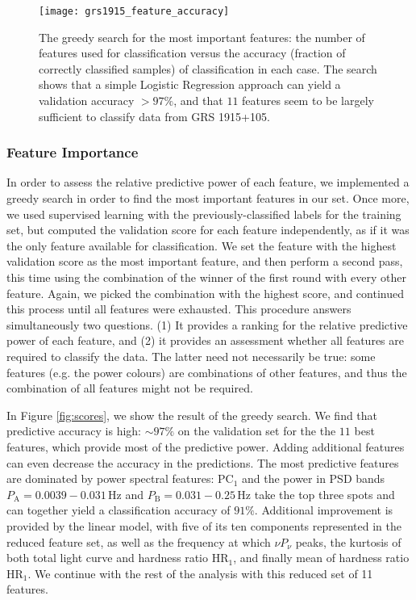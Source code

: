 \documentclass[12pt]{emulateapj}
\begin{document}
\begin{figure}[htbp]
\begin{center}
\texttt{[image: grs1915\_feature\_accuracy]}
\caption{The greedy search for the most important features: the number of features used for classification versus the accuracy (fraction of correctly classified samples) of classification in each case. The search shows that a simple Logistic Regression approach can yield a validation accuracy $>97\%$, and that $11$ features seem to be largely sufficient to classify data from GRS 1915+105.}
\label{fig:asm_total}
\end{center}
\end{figure}

\subsubsection{Feature Importance}

In order to assess the relative predictive power of each feature, we implemented a greedy search in order to find the most important features in our set. 
Once more, we used supervised learning with the previously-classified labels for the training set, but computed the validation score for each feature independently, as if it was the only feature available for classification. We set the feature with the highest validation score as the most important feature, and then perform a second pass, this time using the combination of the winner of the first round with every other feature. Again, we picked the combination with the highest score, and continued this process until all features were exhausted. This procedure answers simultaneously two questions. (1) It provides a ranking for the relative predictive power of each feature, and (2) it provides an assessment whether all features are required to classify the data. The latter need not necessarily be true: some features (e.g. the power colours) are combinations of other features, and thus the combination of all features might not be required.

In Figure \ref{fig:scores}, we show the result of the greedy search. We find that predictive accuracy is high: $\sim\!\! 97\%$ on the validation set for the the $11$ best features, which provide most of the predictive power. Adding additional features can even decrease the accuracy in the predictions. The most predictive features are dominated by power spectral features: $\mathrm{PC}_1$ and the power in PSD bands  $P_\mathrm{A} = 0.0039-0.031 \,\mathrm{Hz}$ and $P_\mathrm{B} = 0.031-0.25 \,\mathrm{Hz}$ take the top three spots and can together yield a classification accuracy of $91\%$. Additional improvement is provided by the linear model, with five of its ten components represented in the reduced feature set, as well as the frequency at which $\nu P_\nu$ peaks, the kurtosis of both total light curve and hardness ratio $\mathrm{HR}_1$, and finally mean of hardness ratio $\mathrm{HR}_1$. We continue with the rest of the analysis with this reduced set of 11 features.
\end{document}
